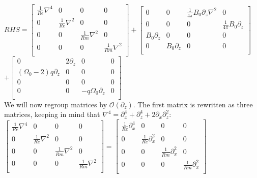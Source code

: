 \documentclass[letterpaper,12pt]{article}
\newcommand\reye{\mathrel{Re}}
\newcommand\reym{\mathrel{Rm}}
\begin{document}
$RHS = \left[\begin{matrix}
\frac{1}{\reye} \nabla^4 & 0 & 0 & 0 \\
0 & \frac{1}{\reye}\nabla^2 & 0 & 0 \\
0 & 0 & \frac{1}{\reym}\nabla^2 & 0 \\
0 & 0 & 0 & \frac{1}{\reym}\nabla^2 \\ 
\end{matrix}\right] + \left[\begin{matrix}
0 & 0 & \frac{1}{4\pi}B_0 \partial_z \nabla^2 & 0 \\
0 & 0 & 0 & \frac{1}{4\pi} B_0 \partial_z \\
B_0 \partial_z & 0 & 0 & 0 \\
0 & B_0 \partial_z & 0 & 0 \\ \end{matrix}\right]$ \\

$+ \left[\begin{matrix}
0 & 2\partial_z & 0 & 0 \\
\left(\Omega_0 - 2\right)q\partial_z & 0 & 0 & 0 \\
0 & 0 & 0 & 0 \\
0 & 0 & -q\Omega_0\partial_z & 0 \\ \end{matrix}\right]$ \\

We will now regroup matrices by $\mathcal{O}(\partial_z)$. The first matrix is rewritten as three matrices, keeping in mind that $\nabla^4 = \partial_x^4 + \partial_z^4 + 2\partial_x\partial_z^2$: \\

$\left[\begin{matrix}
\frac{1}{\reye} \nabla^4 & 0 & 0 & 0 \\
0 & \frac{1}{\reye}\nabla^2 & 0 & 0 \\
0 & 0 & \frac{1}{\reym}\nabla^2 & 0 \\
0 & 0 & 0 & \frac{1}{\reym}\nabla^2 \\ 
\end{matrix}\right] = \left[\begin{matrix}
\frac{1}{\reye}\partial_x^4 & 0 & 0 & 0 \\
0 & \frac{1}{\reye}\partial_x^2 & 0 &0 \\
0 & 0 & \frac{1}{\reym}\partial_x^2 & 0 \\
0 & 0 & 0 & \frac{1}{\reym}\partial_x^2 \\ \end{matrix}\right] $ \\
\end{document}
